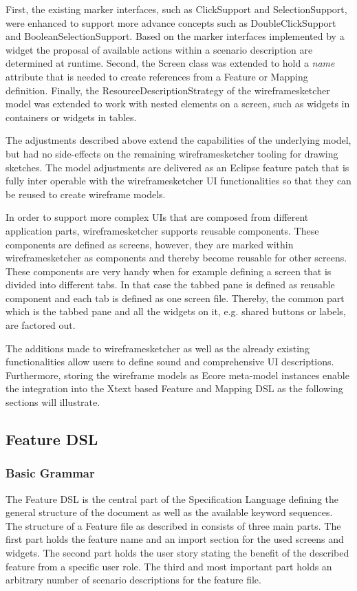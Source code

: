 \documentclass{sig-alternate-05-2015}
\begin{document}
First, the existing marker interfaces, such as ClickSupport and SelectionSupport, were enhanced to support more advance concepts such as DoubleClickSupport and BooleanSelectionSupport.
Based on the marker interfaces implemented by a widget the proposal of available actions within a scenario description are determined at runtime.
Second, the Screen class was extended to hold a \textit{name} attribute that is needed to create references from a Feature or Mapping definition.
Finally, the ResourceDescriptionStrategy of the wireframesketcher model was extended to work with nested elements on a screen, such as widgets in containers or widgets in tables.

The adjustments described above extend the capabilities of the underlying model, but had no side-effects on the remaining wireframesketcher tooling for drawing sketches.
The model adjustments are delivered as an Eclipse feature patch that is fully inter operable with the wireframesketcher UI functionalities so that they can be reused to create wireframe models.

In order to support more complex UIs that are composed from different application parts, wireframesketcher supports reusable components.
These components are defined as screens, however, they are marked within wireframesketcher as components and thereby become reusable for other screens.
These components are very handy when for example defining a screen that is divided into different tabs.
In that case the tabbed pane is defined as reusable component and each tab is defined as one screen file.
Thereby, the common part which is the tabbed pane and all the widgets on it, e.g. shared buttons or labels, are factored out.

The additions made to wireframesketcher as well as the already existing functionalities allow users to define sound and comprehensive UI descriptions. 
Furthermore, storing the wireframe models as Ecore meta-model instances enable the integration into the Xtext based Feature and Mapping DSL as the following sections will illustrate.

\subsection{Feature DSL}
\subsubsection{Basic Grammar}
The Feature DSL is the central part of the Specification Language defining the general structure of the document as well as the available keyword sequences.
The structure of a Feature file as described in  consists of three main parts.
The first part holds the feature name and an import section for the used screens and widgets.
The second part holds the user story stating the benefit of the described feature from a specific user role.
The third and most important part holds an arbitrary number of scenario descriptions for the feature file.
\end{document}

